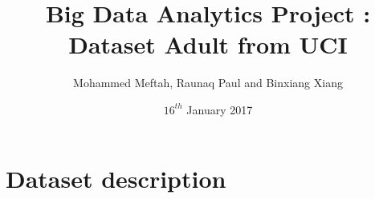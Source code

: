 \documentclass[10pt]{article} %
\title{Big Data Analytics Project : Dataset Adult from UCI }
\author{Mohammed Meftah, Raunaq Paul and Binxiang Xiang}
\date{$16^{th}$ January 2017}
\begin{document}
\maketitle
\newpage
\section{Dataset description}
\end{document}
